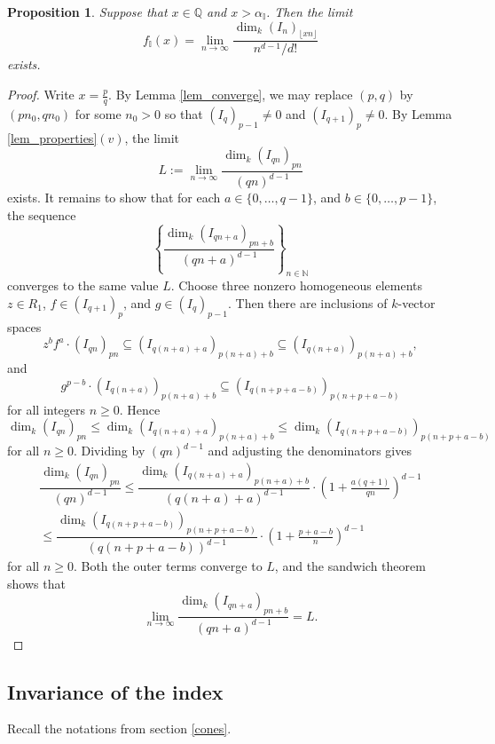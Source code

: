 \documentclass[12pt,a4paper]{amsart}
\theoremstyle{plain}
\newtheorem{proposition}[theorem]{Proposition}
\theoremstyle{definition}
\numberwithin{equation}{theorem}
\begin{document}
\begin{proposition}\label{prop_rational}
Suppose that $x\in \mathbb{Q}$ and $x>\alpha_{\mathbb{I}}$. Then the limit $$f_{\mathbb{I}}(x) = \lim_{n\to\infty}\dfrac{\dim_k {\left(I_n\right)}_{\lfloor xn \rfloor}}{n^{d-1}/d!}$$ exists.
\end{proposition}
\begin{proof}
Write $x=\frac{p}{q}$. By Lemma \ref{lem_converge}, we may replace $(p,q)$ by $(pn_0,qn_0)$ for some $n_0>0$ so that ${\left(I_{q}\right)}_{p-1}\neq 0$ and ${\left(I_{q+1}\right)}_{p}\neq 0$. By Lemma \ref{lem_properties}\;$(v)$, the limit $$L:=\lim_{n\to\infty}\dfrac{\dim_k {\left(I_{qn}\right)}_{pn}}{(qn)^{d-1}}$$ exists. It remains to show that for each $a\in\{0,\ldots,q-1\}$, and $b\in\{0,\ldots,p-1\}$, the sequence $$\left\{\dfrac{\dim_k {\left(I_{qn+a}\right)}_{pn+b}}{(qn+a)^{d-1}}\right\}_{n\in\mathbb{N}}$$ converges to the same value $L$. Choose three nonzero homogeneous elements $z\in R_1$, $f\in {\left(I_{q+1}\right)}_p$, and $g\in {\left(I_{q}\right)}_{p-1}$. Then there are inclusions of $k$-vector spaces $$z^b f^a\cdot {\left(I_{qn}\right)}_{pn} \subseteq {\left(I_{q(n+a)+a}\right)}_{p(n+a)+b}\subseteq {\left(I_{q(n+a)}\right)}_{p(n+a)+b},$$ and
$$g^{p-b}\cdot{\left(I_{q(n+a)}\right)}_{p(n+a)+b}\subseteq {\left(I_{q(n+p+a-b)}\right)}_{p(n+p+a-b)}$$ for all integers $n\geq 0$. Hence $$\dim_k {\left(I_{qn}\right)}_{pn} \leq \dim_k {\left(I_{q(n+a)+a}\right)}_{p(n+a)+b} \leq \dim_k {\left(I_{q(n+p+a-b)}\right)}_{p(n+p+a-b)}$$ for all $n\geq 0$. Dividing by $(qn)^{d-1}$ and adjusting the denominators gives
\begin{multline*}
 \dfrac{\dim_k {\left(I_{qn}\right)}_{pn}}{(qn)^{d-1}} \leq \dfrac{\dim_k {\left(I_{q(n+a)+a}\right)}_{p(n+a)+b}}{(q(n+a)+a)^{d-1}} \cdot \left(1+\frac{a(q+1)}{qn}\right)^{d-1}\\ \leq \dfrac{\dim_k {\left(I_{q(n+p+a-b)}\right)}_{p(n+p+a-b)}}{(q(n+p+a-b))^{d-1}}\cdot \left(1+\frac{p+a-b}{n}\right)^{d-1}
\end{multline*}
for all $n\geq 0$. Both the outer terms converge to $L$, and the sandwich theorem shows that $$\lim_{n\to\infty}\dfrac{\dim_k {\left(I_{qn+a}\right)}_{pn+b}}{(qn+a)^{d-1}}=L.$$
\end{proof}

\subsection{Invariance of the index}

Recall the notations from section \ref{cones}.
\end{document}
